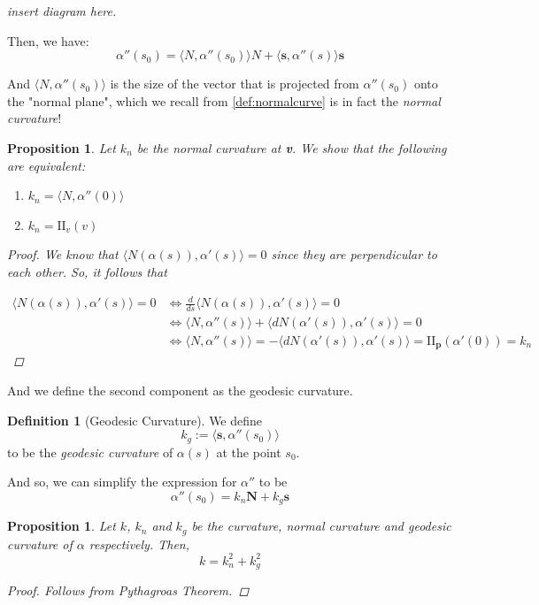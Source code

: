 \documentclass[10pt, a4paper]{article}
\theoremstyle{plain}
\newtheorem{proposition}[theorem]{Proposition}
\theoremstyle{definition}
\newtheorem{definition}[theorem]{Definition}
\theoremstyle{remark}
\begin{document}
\textit{insert diagram here.}

Then, we have:
$$\alpha''(s_0) = \langle N, \alpha''(s_0) \rangle N + \langle \textbf{s}, \alpha''(s)\rangle \textbf{s}$$

And $\langle N, \alpha''(s_0)\rangle$ is the size of the vector that is projected from $\alpha''(s_0) $ onto the "normal plane", which we recall from \ref{def:normalcurve} is in fact the \textit{normal curvature}!

\begin{proposition}
    Let $k_n$ be the normal curvature at \textbf{v}. We show that the following are equivalent:
    \begin{enumerate} 
        \item $k_n = \langle N, \alpha''(0) \rangle$
        \item $k_n = \mathrm{II}_{v}(v)$
    \end{enumerate}
    \begin{proof}
        We know that $\langle N(\alpha(s)), \alpha'(s)\rangle = 0$ since they are perpendicular to each other. So, it follows that

        \begin{align*}
            \langle N(\alpha(s)), \alpha'(s)\rangle = 0 &\iff \frac{d}{ds} \langle N(\alpha(s)), \alpha'(s)\rangle = 0\\ 
            &\iff \langle N, \alpha''(s) \rangle + \langle dN (\alpha'(s)), \alpha'(s) \rangle = 0
            \\
            &\iff \langle N, \alpha''(s) \rangle = - \langle dN(\alpha'(s)), \alpha'(s)\rangle = \textrm{II}_\textbf{p}(\alpha'(0)) = k_n
        \end{align*}
    \end{proof}
\end{proposition}

And we define the second component as the geodesic curvature.
\begin{definition}[Geodesic Curvature]\label{def:geodesiccurve}
    We define $$k_g := \langle \textbf{s}, \alpha''(s_0)\rangle$$ to be the \textit{geodesic curvature} of $\alpha(s)$ at the point $s_0$.
\end{definition}

And so, we can simplify the expression for $\alpha''$ to be $$\alpha ''(s_0) = k_n \textbf{N}+ k_g \textbf{s}$$

\begin{proposition}
Let $k$, $k_n$ and $k_g$ be the curvature, \textit{normal curvature} and \textit{geodesic curvature} of $\alpha$ respectively. Then,
    $$k= k_n^2+k_g^2$$

    \begin{proof}
    Follows from Pythagroas Theorem.
    \end{proof}
\end{proposition}
\end{document}
